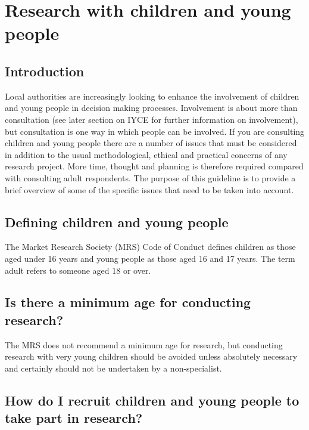 

\section{Research with children and young people}

\subsection{Introduction}

Local authorities are increasingly looking to enhance the involvement of children and young people in decision making processes. Involvement is about more than consultation (see later section on IYCE for further information on involvement), but consultation is one way in which people can be involved. If you are consulting children and young people there are a number of issues that must be considered in addition to the usual methodological, ethical and practical concerns of any research project. More time, thought and planning is therefore required compared with consulting adult respondents. The purpose of this guideline is to provide a brief overview of some of the specific issues that need to be
taken into account.\cite{kirklees2019children}

\subsection{Defining children and young people}

The Market Research Society (MRS) Code of Conduct defines children as those aged under 16 years and young people as those aged 16 and 17 years. The term adult refers to someone aged 18 or over.

\subsection{Is there a minimum age for conducting research?}

The MRS does not recommend a minimum age for research, but conducting research with very young children should be avoided unless absolutely necessary and certainly should not be undertaken by a non-specialist.

\subsection{How do I recruit children and young people to take part in research?}

